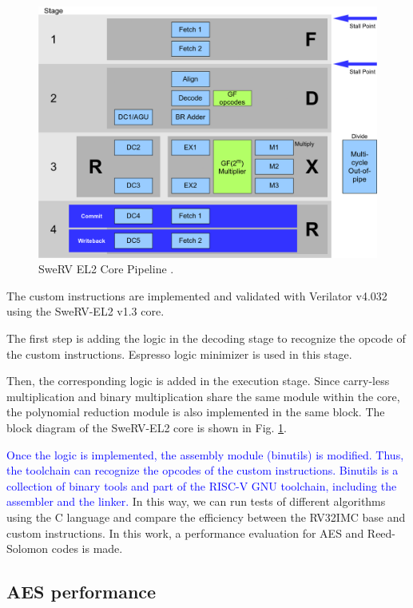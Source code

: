 \begin{figure}[b]
    \centering
    \includegraphics[width=0.95\linewidth]{img/swerv.png}
    \caption{SweRV EL2 Core Pipeline \cite{swervel2}.}
    \label{fig:swerv}
\end{figure}

The custom instructions are implemented and validated with Verilator v4.032 using the SweRV-EL2 v1.3 core.

The first step is adding the logic in the decoding stage to recognize the opcode of the custom instructions. 
Espresso logic minimizer \cite{250190} is used in this stage.

Then, the corresponding logic is added in the execution stage. Since carry-less multiplication and binary 
multiplication share the same module within the core, the polynomial reduction module is also implemented 
in the same block. The block diagram of the SweRV-EL2 core is shown in Fig. \ref{fig:swerv}.

\textcolor{blue}{Once the logic is implemented, the assembly module (binutils) is modified. Thus, the toolchain can recognize 
the opcodes of the custom instructions. Binutils is a collection of 
binary tools and part of the RISC-V GNU toolchain, including the assembler and the linker.}
In this way, we can run tests of different algorithms using the C language and compare the efficiency between the RV32IMC base and custom instructions. 
In this work, a performance evaluation for AES and Reed-Solomon codes is made.

\subsection{AES performance} 

